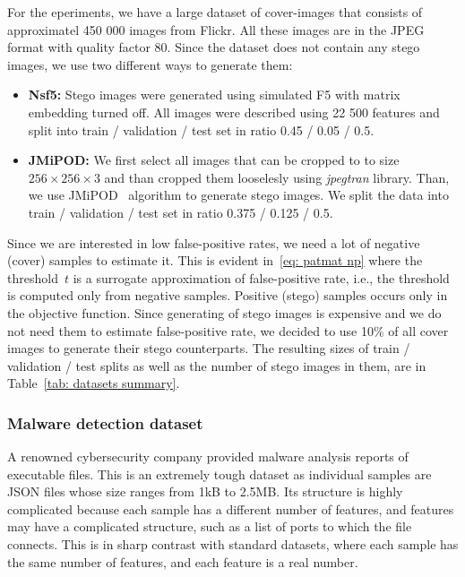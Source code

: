For the eperiments, we have a large dataset of cover-images that consists of approximatel 450 000 images from Flickr. All these images are in the JPEG format with quality factor 80. Since the dataset does not contain any stego images, we use two different ways to generate them:
\begin{itemize}
  \item \textbf{Nsf5:} Stego images were generated using simulated F5 with matrix embedding turned off. All images were described using 22 500 features and split into train / validation / test set in ratio 0.45 / 0.05 / 0.5.
  \item  \textbf{JMiPOD:} We first select all images that can be cropped to to size $256 \times 256 \times 3$ and than cropped them looselesly using \emph{jpegtran} library. Than, we use JMiPOD~\cite{cogranne2020steganography} algorithm to generate stego images. We split the data into train / validation / test set in ratio 0.375 / 0.125 / 0.5.
\end{itemize}
Since we are interested in low false-positive rates, we need a lot of negative (cover) samples to estimate it. This is evident in~\eqref{eq: patmat np} where the threshold~$t$ is a surrogate approximation of false-positive rate, i.e., the threshold is computed only from negative samples. Positive (stego) samples occurs only in the objective function. Since generating of stego images is expensive and we do not need them to estimate false-positive rate, we decided to use 10\% of all cover images to generate their stego counterparts. The resulting sizes of train / validation / test splits as well as the number of stego images in them, are in Table~\ref{tab: datasets summary}.

\subsubsection{Malware detection dataset}

A renowned cybersecurity company provided malware analysis reports of executable files. This is an extremely tough dataset as individual samples are JSON files whose size ranges from 1kB to 2.5MB. Its structure is highly complicated because each sample has a different number of features, and features may have a complicated structure, such as a list of ports to which the file connects. This is in sharp contrast with standard datasets, where each sample has the same number of features, and each feature is a real number.


